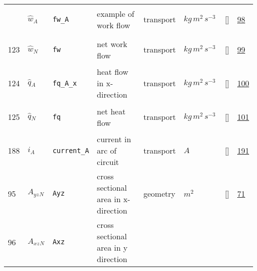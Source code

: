 \begin{longtable}{|p{1cm}|p{3cm}|p{3cm}|p{7cm}|p{3.0cm}|p{3cm}|p{2cm}|p{1cm}|}
             & \hypertarget{"v:122"}{ $ {\hat{w}}{_{A}} $}
             & \verb|fw_A|
             & example of work flow
             & \begin{lay}transport \end{lay}
             & $ kg \,m^{2} \,s^{-3} \, $
             & []
             & \hyperlink{"e:98"}{ 98 }
                 \\
    123
             & \hypertarget{"v:123"}{ $ {\hat{w}}{_{N}} $}
             & \verb|fw|
             & net work flow
             & \begin{lay}transport \end{lay}
             & $ kg \,m^{2} \,s^{-3} \, $
             & []
             & \hyperlink{"e:99"}{ 99 }
                 \\
    124
             & \hypertarget{"v:124"}{ $ {\hat{q}}{_{A}} $}
             & \verb|fq_A_x|
             & heat flow in x-direction
             & \begin{lay}transport \end{lay}
             & $ kg \,m^{2} \,s^{-3} \, $
             & []
             & \hyperlink{"e:100"}{ 100 }
                 \\
    125
             & \hypertarget{"v:125"}{ $ {\hat{q}}{_{N}} $}
             & \verb|fq|
             & net heat flow
             & \begin{lay}transport \end{lay}
             & $ kg \,m^{2} \,s^{-3} \, $
             & []
             & \hyperlink{"e:101"}{ 101 }
                 \\
    188
             & \hypertarget{"v:188"}{ $ {i}{_{A}} $}
             & \verb|current_A|
             & current in arc of circuit
             & \begin{lay}transport \end{lay}
             & $ A \, $
             & []
             & \hyperlink{"e:191"}{ 191 }
                 \\
    95
             & \hypertarget{"v:95"}{ $ {A_{yz}}{_{N}} $}
             & \verb|Ayz|
             & cross sectional area in x-direction
             & \begin{lay}geometry \end{lay}
             & $ m^{2} \, $
             & []
             & \hyperlink{"e:71"}{ 71 }
                 \\
    96
             & \hypertarget{"v:96"}{ $ {A_{xz}}{_{N}} $}
             & \verb|Axz|
             & cross sectional area in y direction

\end{longtable}
